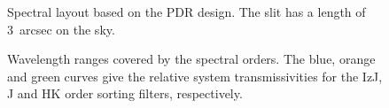 \documentclass[a4paper,twoside,11pt]{article}
\begin{document}
\begin{figure}[hb]
  \caption{Spectral layout based on the PDR design. The slit has a
    length of 3~arcsec on the sky.}
  \label{fig:spectral_layout}
\end{figure}

\begin{figure}[ht]
  \centering
  \caption{Wavelength ranges covered by the spectral orders. The blue,
    orange and green curves give the relative system transmissivities
    for the IzJ, J and HK order sorting filters, respectively.}
  \label{fig:spectral_orders_wavelength}
\end{figure}

\end{document}

